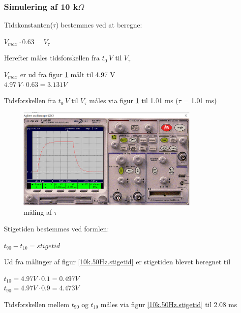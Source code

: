 \subsubsection{Simulering af 10 k$\Omega$ }
Tidskonstanten($\tau$) bestemmes ved at beregne:

\begin{center}
$V_{max} \cdot 0.63 = V_{\tau}$
\end{center}

Herefter måles tidsforskellen fra $t_0 \  V$ til $V_{\tau}$

$V_{max}$ er ud fra figur \ref{10k.50Hz.tau} målt til 4.97 V
\\ 
$4.97 \ V \cdot 0.63 = 3.131 V$

Tidsforskellen fra $t_0 \ V$ til $V_{\tau}$ måles via figur \ref{10k.50Hz.tau} til 1.01 ms ($\tau$ = 1.01 ms)


\begin{figure}[h]
 \begin{center}
  \includegraphics[height=5cm]{P_Fig/figur3_10k_50Hz_tau.png}
  \caption{måling af $\tau$}
  \label{10k.50Hz.tau}
 \end{center}
\end{figure}

\newpage

Stigetiden bestemmes ved formlen:
\begin{center}
$t_{90} - t_{10} = stigetid$
\end{center}

Ud fra målinger af figur \ref{10k.50Hz.stigetid}
er stigetiden blevet beregnet til

\begin{center}
$t_{10} = 4.97 V \cdot 0.1 = 0.497 V$
\\
$t_{90} = 4.97 V \cdot 0.9 = 4.473 V$
\end{center}

Tidsforskellen mellem $t_{90}$ og $t_{10}$ måles via figur \ref{10k.50Hz.stigetid} til 2.08 ms

